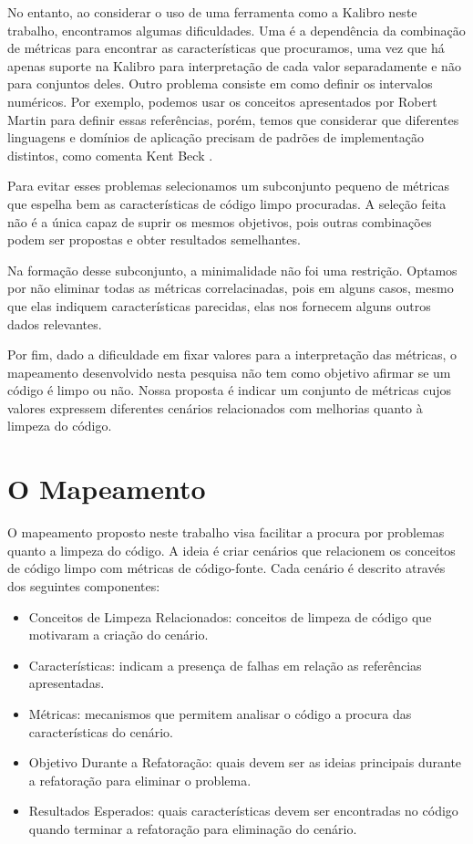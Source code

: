 No entanto, ao considerar o uso de uma ferramenta como a Kalibro neste trabalho, encontramos algumas dificuldades. Uma é a dependência da combinação de métricas para encontrar as características que procuramos, uma vez que há apenas suporte na Kalibro para interpretação de cada valor separadamente e não para conjuntos deles. Outro problema consiste em como definir os intervalos numéricos. Por exemplo, podemos usar os conceitos apresentados por Robert Martin \citep{Martin2008} para definir essas referências, porém, temos que considerar que diferentes linguagens e domínios de aplicação precisam de padrões de implementação distintos, como comenta Kent Beck \citep{Beck2007}.	

Para evitar esses problemas selecionamos um subconjunto pequeno de métricas que espelha bem as características de código limpo procuradas. A seleção feita não é a única capaz de suprir os mesmos objetivos, pois outras combinações podem ser propostas e obter resultados semelhantes.

Na formação desse subconjunto, a minimalidade não foi uma restrição. Optamos por não eliminar todas as métricas correlacinadas, pois em alguns casos, mesmo que elas indiquem características parecidas, elas nos fornecem alguns outros dados relevantes.

Por fim, dado a dificuldade em fixar valores para a interpretação das métricas, o mapeamento desenvolvido nesta pesquisa não tem como objetivo afirmar se um código é limpo ou não. Nossa proposta é indicar um conjunto de métricas cujos valores expressem diferentes cenários relacionados com melhorias quanto à limpeza do código.
						
	
\section{O Mapeamento}
                    
O mapeamento proposto neste trabalho visa facilitar a procura por problemas quanto a limpeza do código. A ideia é criar cenários que relacionem os conceitos de código limpo com métricas de código-fonte. Cada cenário é descrito através dos seguintes componentes:
	
\begin{itemize}
	\item Conceitos de Limpeza Relacionados: conceitos de limpeza de código que motivaram a criação do cenário.
	\item Características: indicam a presença de falhas em relação as referências apresentadas.
	\item Métricas: mecanismos que permitem analisar o código a procura das características do cenário.
	\item Objetivo Durante a Refatoração: quais devem ser as ideias principais durante a refatoração para eliminar o problema.
	\item Resultados Esperados: quais características devem ser encontradas no código quando terminar a refatoração para eliminação do cenário.
\end{itemize}	


